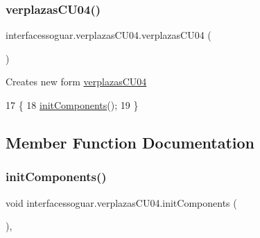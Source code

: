 \subsubsection{\texorpdfstring{verplazas\+C\+U04()}{verplazasCU04()}}
{\footnotesize\ttfamily interfacessoguar.\+verplazas\+C\+U04.\+verplazas\+C\+U04 (\begin{DoxyParamCaption}{ }\end{DoxyParamCaption})\hspace{0.3cm}{\ttfamily [inline]}}

Creates new form \mbox{\hyperlink{classinterfacessoguar_1_1verplazas_c_u04}{verplazas\+C\+U04}} 
\begin{DoxyCode}
17                            \{
18         \mbox{\hyperlink{classinterfacessoguar_1_1verplazas_c_u04_a2ff9f21239da86da0eb45875e8de0337}{initComponents}}();
19     \}
\end{DoxyCode}


\subsection{Member Function Documentation}
\mbox{\label{classinterfacessoguar_1_1verplazas_c_u04_a2ff9f21239da86da0eb45875e8de0337}} 
\subsubsection{\texorpdfstring{init\+Components()}{initComponents()}}
{\footnotesize\ttfamily void interfacessoguar.\+verplazas\+C\+U04.\+init\+Components (\begin{DoxyParamCaption}{ }\end{DoxyParamCaption})\hspace{0.3cm}{\ttfamily [inline]}, {\ttfamily [private]}}

